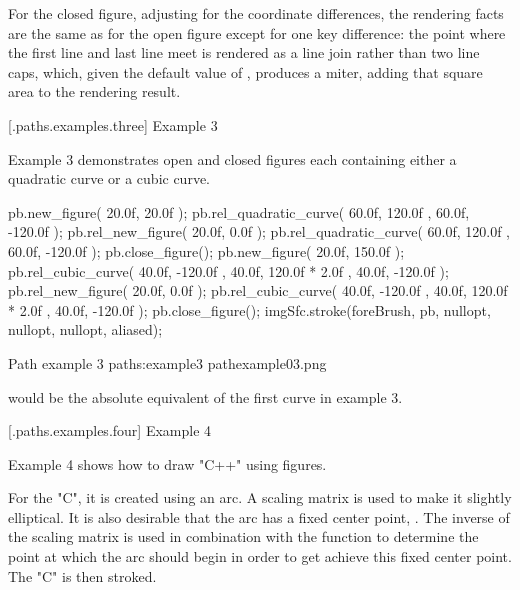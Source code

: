 \pnum
For the closed figure, adjusting for the coordinate differences, the rendering facts are the same as for the open figure except for one key difference: the point where the first line and last line meet is rendered as a line join rather than two line caps, which, given the default value of , produces a miter, adding that square area to the rendering result.

 [\iotwod.paths.examples.three] {Example 3}

\pnum
Example 3 demonstrates open and closed figures each containing either a quadratic curve or a cubic curve.

\begin{codeblock}
pb.new_figure({ 20.0f, 20.0f });
pb.rel_quadratic_curve({ 60.0f, 120.0f }, { 60.0f, -120.0f });
pb.rel_new_figure({ 20.0f, 0.0f });
pb.rel_quadratic_curve({ 60.0f, 120.0f }, { 60.0f, -120.0f });
pb.close_figure();
pb.new_figure({ 20.0f, 150.0f });
pb.rel_cubic_curve({ 40.0f, -120.0f }, { 40.0f, 120.0f * 2.0f },
  { 40.0f, -120.0f });
pb.rel_new_figure({ 20.0f, 0.0f });
pb.rel_cubic_curve({ 40.0f, -120.0f }, { 40.0f, 120.0f * 2.0f },
  { 40.0f, -120.0f });
pb.close_figure();
imgSfc.stroke(foreBrush, pb, nullopt, nullopt, nullopt, aliased);
\end{codeblock}

\begin{importgraphiciotwod}
{Path example 3}
{paths:example3}
{pathexample03.png}
\end{importgraphiciotwod}

\FloatBarrier

\pnum
\begin{note}
 would be the absolute equivalent of the first curve in example 3.
\end{note}

 [\iotwod.paths.examples.four] {Example 4}

\pnum
Example 4 shows how to draw "C++" using figures.

\pnum
For the "C", it is created using an arc. A scaling matrix is used to make it  slightly elliptical. It is also desirable that the arc has a fixed center point, . The inverse of the scaling matrix is used in combination with the  function to determine the point at which the arc should begin in order to get achieve this fixed center point. The "C" is then stroked.


